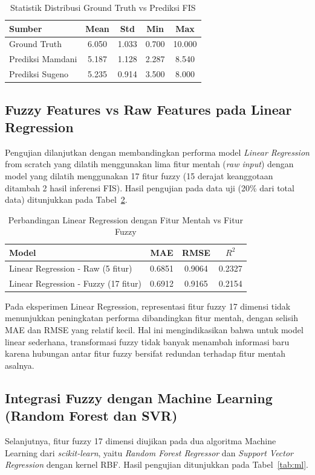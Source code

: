 \documentclass[11pt,a4paper]{article}
\begin{document}
\begin{table}[H]
\centering
\caption{Statistik Distribusi Ground Truth vs Prediksi FIS}
\label{tab:distribusi}
\begin{tabular}{lcccc}
\toprule
\textbf{Sumber} & \textbf{Mean} & \textbf{Std} & \textbf{Min} & \textbf{Max} \\
\midrule
Ground Truth & 6.050 & 1.033 & 0.700 & 10.000 \\
Prediksi Mamdani & 5.187 & 1.128 & 2.287 & 8.540 \\
Prediksi Sugeno & 5.235 & 0.914 & 3.500 & 8.000 \\
\bottomrule
\end{tabular}
\end{table}

\subsection{Fuzzy Features vs Raw Features pada Linear Regression}
Pengujian dilanjutkan dengan membandingkan performa model \textit{Linear Regression} from scratch yang dilatih menggunakan lima fitur mentah (\textit{raw input}) dengan model yang dilatih menggunakan 17 fitur fuzzy (15 derajat keanggotaan ditambah 2 hasil inferensi FIS). Hasil pengujian pada data uji (20\% dari total data) ditunjukkan pada Tabel~\ref{tab:linreg}.

\begin{table}[H]
\centering
\caption{Perbandingan Linear Regression dengan Fitur Mentah vs Fitur Fuzzy}
\label{tab:linreg}
\begin{tabular}{lccc}
\toprule
\textbf{Model} & \textbf{MAE} & \textbf{RMSE} & \textbf{$R^2$} \\
\midrule
Linear Regression - Raw (5 fitur) & 0.6851 & 0.9064 & 0.2327 \\
Linear Regression - Fuzzy (17 fitur) & 0.6912 & 0.9165 & 0.2154 \\
\bottomrule
\end{tabular}
\end{table}

Pada eksperimen Linear Regression, representasi fitur fuzzy 17 dimensi tidak menunjukkan peningkatan performa dibandingkan fitur mentah, dengan selisih MAE dan RMSE yang relatif kecil. Hal ini mengindikasikan bahwa untuk model linear sederhana, transformasi fuzzy tidak banyak menambah informasi baru karena hubungan antar fitur fuzzy bersifat redundan terhadap fitur mentah asalnya.

\subsection{Integrasi Fuzzy dengan Machine Learning (Random Forest dan SVR)}
Selanjutnya, fitur fuzzy 17 dimensi diujikan pada dua algoritma Machine Learning dari \textit{scikit-learn}, yaitu \textit{Random Forest Regressor} dan \textit{Support Vector Regression} dengan kernel RBF. Hasil pengujian ditunjukkan pada Tabel~\ref{tab:ml}.
\end{document}
